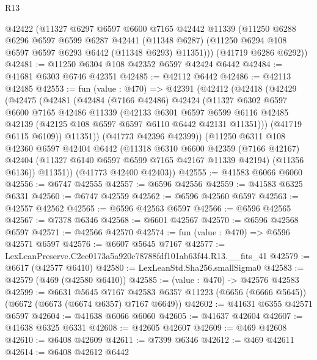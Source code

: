 \begin{lexlean}{R13}
\begin{coremodule}
      @42422
      (@11327
        @6297
        @6597
        @6600
        @7165
        @42442
        @11339
        (@11250
          @6288
          @6296
          @6597
          @6599
          @6287
          @42441
          (@11348 @6287)
          (@11250 @6294 @108 @6597 @6597 @6293 @6442 (@11348 @6293) @11351)))
      (@41719 @6286 @6292))
@42481 := @11250 @6304 @108 @42352 @6597 @42424 @6442
@42484 := @41681 @6303 @6746 @42351
@42485 := @42112 @6442
@42486 := @42113 @42485
@42553 := fun (value : @470) =>
  @42391
    (@42412
      (@42418
        (@42429
          (@42475
            (@42481
              (@42484
                (@7166 @42486)
                @42424
                (@11327
                  @6302
                  @6597
                  @6600
                  @7165
                  @42486
                  @11339
                  (@42133
                    @6301
                    @6597
                    @6599
                    @6116
                    @42485
                    @42139
                    (@42125 @108 @6597 @6597 @6110 @6442 @42131 @11351)))
                (@41719 @6115 @6109))
              @11351))
          (@41773 @42396 @42399))
        (@11250
          @6311
          @108
          @42360
          @6597
          @42404
          @6442
          (@11318
            @6310
            @6600
            @42359
            (@7166 @42167)
            @42404
            (@11327 @6140 @6597 @6599 @7165 @42167 @11339 @42194)
            (@11356 @6136))
          @11351))
      (@41773 @42400 @42403))
@42555 := @41583 @6066 @6060
@42556 := @6747 @42555
@42557 := @6596 @42556
@42559 := @41583 @6325 @6331
@42560 := @6747 @42559
@42562 := @6596 @42560 @6597
@42563 := @42557 @42562
@42565 := @6596 @42563 @6597
@42566 := @6596 @42565
@42567 := @7378 @6346
@42568 := @6601 @42567
@42570 := @6596 @42568 @6597
@42571 := @42566 @42570
@42574 := fun (value : @470) => @6596 @42571 @6597
@42576 := @6607 @5645 @7167
@42577 := LexLeanPreserve.C2ee0173a5a920c78788fdf101ab63f44.R13.__fits_41
@42579 := @6617 (@42577 @6410)
@42580 := LexLeanStd.Sha256.smallSigma0
@42583 := @42579 (@469 (@42580 @6410))
@42585 := (value : @470) -> @42576 @42583
@42599 := @6631
    @5645
    @7167
    @42583
    @6357
    @11223
    (@6656 (@6666 @5645))
    (@6672 (@6673 (@6674 @6357) @7167 @6649))
@42602 := @41631 @6355 @42571 @6597
@42604 := @41638 @6066 @6060
@42605 := @41637 @42604
@42607 := @41638 @6325 @6331
@42608 := @42605 @42607
@42609 := @469 @42608
@42610 := @6408 @42609
@42611 := @7399 @6346
@42612 := @469 @42611
@42614 := @6408 @42612 @6442

\end{coremodule}
\end{lexlean}
